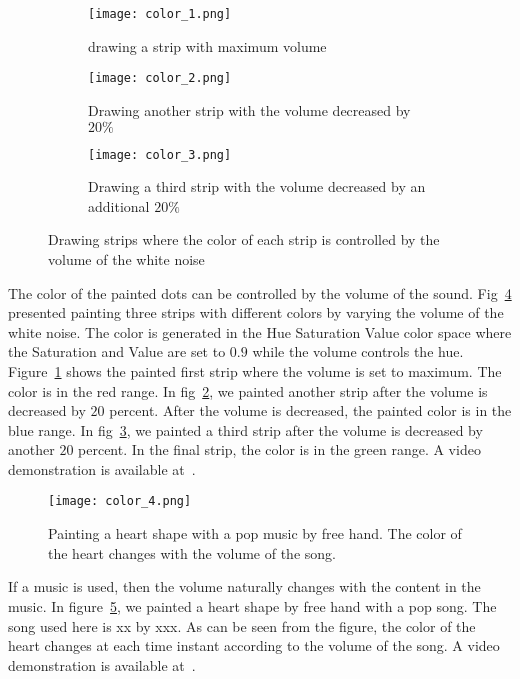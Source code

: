 \begin{figure}[h!]
\centering
  \begin{subfigure}[]{.48\textwidth}
    \texttt{[image: color\_1.png]}
    \caption{drawing a strip with maximum volume}
    \label{fig:show_color_1_1}
  \end{subfigure}
  \begin{subfigure}[]{.48\textwidth}
    \texttt{[image: color\_2.png]}
    \caption{Drawing another strip with the volume decreased by $20\%$}
    \label{fig:show_color_1_2}
  \end{subfigure}
  \begin{subfigure}[]{.48\textwidth}
    \texttt{[image: color\_3.png]}
    \caption{Drawing a third strip with the volume decreased by an additional $20\%$}
    \label{fig:show_color_1_3}
  \end{subfigure}
  \caption{Drawing strips where the color of each strip is controlled by the volume of the white noise}
  \label{fig:show_color}
\end{figure}

The color of the painted dots can be controlled by the volume of the sound. Fig~\ref{fig:show_color} presented painting three strips with different colors by varying the volume of the white noise. The color is generated in the Hue Saturation Value color space where the Saturation and Value are set to $0.9$ while the volume controls the hue. Figure~\ref{fig:show_color_1_1} shows the painted first strip where the volume is set to maximum. The color is in the red range. In fig~\ref{fig:show_color_1_2}, we painted another strip after the volume is decreased by $20$ percent. After the volume is decreased, the painted color is in the blue range. In fig~\ref{fig:show_color_1_3}, we painted a third strip after the volume is decreased by another $20$ percent. In the final strip, the color is in the green range. A video demonstration is available at~\cite{demo:color}.

\begin{figure}[h!]
  \centering
    \texttt{[image: color\_4.png]}
    \caption{Painting a heart shape with a pop music by free hand. The color of the heart changes with the volume of the song.}
    \label{fig:show_color_2}
\end{figure}

If a music is used, then the volume naturally changes with the content in the music. In figure~\ref{fig:show_color_2}, we painted a heart shape by free hand with a pop song. The song used here is xx by xxx. As can be seen from the figure, the color of the heart changes at each time instant according to the volume of the song. A video demonstration is available at~\cite{demo:color2}.
